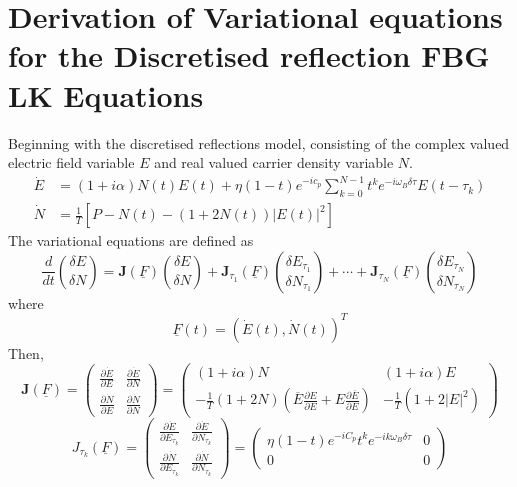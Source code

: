 \section{Derivation of Variational equations for the Discretised reflection FBG LK Equations}
\label{app:lyapunov}
%
Beginning with the discretised reflections model, consisting of the complex valued electric field variable $E$ and real valued carrier density variable $N$. 
\begin{align*}
\dot{E}&=(1+i \alpha) N(t) E(t)+\eta(1-t) e^{-i c_{p}} \sum_{k=0}^{N-1} t^{k} e^{-i \omega_B \delta \tau} E\left(t-\tau_k \right) \\
\dot{N}&=\frac{1}{T}\left[P-N(t)-(1+2 N(t))|E(t)|^{2}\right]
\end{align*}
%
The variational equations are defined as
%
\begin{equation}
    \frac{d}{d t}\binom{\delta E}{\delta N} = \mathbf{J}(\underline{F})\binom{\delta E}{\delta N}+\mathbf{J}_{\tau_{1}}(\underline{F})\binom{\delta E_{\tau_{1}}}{\delta N_{\tau_{1}}} + \cdots + \mathbf{J}_{\tau_{N}}(\underline{F})\binom{\delta E_{\tau_{N}}}{\delta N_{\tau_{N}}}
\end{equation}
%
where
%
\begin{equation*}
    \underline{F}(t)=(\dot{E}(t), \dot{N}(t))^T 
\end{equation*}
%
Then,
%
\begin{equation*}
    \mathbf{J}(\underline{F}) = 
    \left(\begin{array}{cc}
\frac{\partial \dot{E}}{\partial E} & \frac{\partial \dot{E}}{\partial N}\\
\frac{\partial \dot{N}}{\partial E}& \frac{\partial \dot{N}}{\partial N}
\end{array}\right) = 
    \left(\begin{array}{cc}
(1+i \alpha) N & (1+i \alpha) E \\
-\frac{1}{T}(1+2 N) \left( \overline{E}\frac{\partial E}{\partial E} + E\frac{\partial \overline{E}}{\partial E} \right) & -\frac{1}{T}\left(1+2|E|^{2}\right)
\end{array}\right)
\end{equation*}
%
\begin{equation*}
    J_{\tau_{k}}(\underline{F})=\left(\begin{array}{ll}
\frac{\partial \dot{E}}{\partial E_{\tau_{k}}} & \frac{\partial \dot{E}}{\partial N_{\tau_{k}}} \\
\frac{\partial \dot{N}}{\partial E_{\tau_{k}}} & \frac{\partial \dot{N}}{\partial N_{\tau_{k}}}
\end{array}\right)=\left(\begin{array}{cc}
\eta(1-t) e^{-i C_p} t^{k} e^{-i k \omega_B \delta \tau} & 0 \\
0 & 0
\end{array}\right)
\end{equation*}
